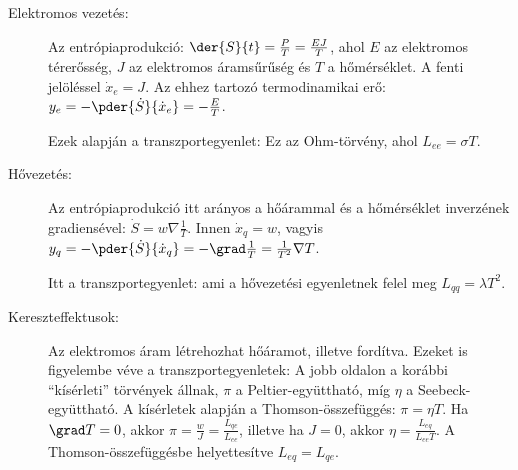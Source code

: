    \begin{description}
    \item[Elektromos vezetés:] Az entrópiaprodukció: $\der{S}{t}=\frac{P}{T}=\frac{EJ}{T}$, ahol $E$ az elektromos térerősség, $J$ az elektromos áramsűrűség és $T$ a hőmérséklet.
   A fenti jelöléssel $\dot x_e=J$.
   Az ehhez tartozó termodinamikai erő: $y_e=-\pder{\dot S}{\dot x_e}=-\frac{E}{T}$.
    
    Ezek alapján a transzportegyenlet: 
    Ez az Ohm-törvény, ahol $L_{ee}=\sigma T$.
    
    \item[Hővezetés: ] Az entrópiaprodukció itt arányos a hőárammal és a hőmérséklet inverzének gradiensével: $\dot S=w\nabla\frac{1}{T}$.
   Innen $\dot x_{q}=w$, vagyis $y_q=-\pder{\dot S}{\dot x_{q}}=-\grad\frac{1}{T}=\frac{1}{T^2}\nabla T$.
    
    Itt a transzportegyenlet:
    ami a hővezetési egyenletnek felel meg $L_{qq}=\lambda T^2$.
    
    \item[Kereszteffektusok: ] Az elektromos áram létrehozhat hőáramot, illetve fordítva.
   Ezeket is figyelembe véve a transzportegyenletek:
    A jobb oldalon a korábbi ``kísérleti'' törvények állnak, $\pi$ a Peltier-együttható, míg $\eta$ a Seebeck-együttható.
   A kísérletek alapján a Thomson-összefüggés: $\pi=\eta T$.
   Ha $\grad T=0$, akkor $\pi=\frac{w}{J}=\frac{L_{qe}}{L_{ee}}$, illetve ha $J=0$, akkor $\eta=\frac{L_{eq}}{L_{ee}T}$.
   A Thomson-összefüggésbe helyettesítve $L_{eq}=L_{qe}$.
   \end{description}
